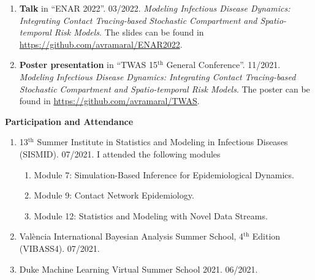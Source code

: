 \documentclass[11pt, ]{article}
\begin{document}
	\begin{enumerate}
		
		
		
		\item \textbf{Talk} in ``ENAR 2022''. 03/2022. \textit{Modeling Infectious Disease Dynamics: Integrating Contact Tracing-based	Stochastic Compartment and Spatio-temporal Risk Models}. The slides can be found in \href{https://github.com/avramaral/ENAR2022}{https://github.com/avramaral/ENAR2022}.
		
		\item \textbf{Poster presentation} in ``TWAS 15${}^{\text{th}}$ General Conference''. 11/2021. \textit{Modeling Infectious Disease Dynamics: Integrating Contact Tracing-based	Stochastic Compartment and Spatio-temporal Risk Models}. The poster can be found in \href{https://github.com/avramaral/TWAS}{https://github.com/avramaral/TWAS}.
	\end{enumerate}

{\Large \textbf{Participation and Attendance}}

\begin{enumerate}
	\item 13${}^{\text{th}}$ Summer Institute in Statistics and Modeling in Infectious Diseases (SISMID). 07/2021. I attended the following modules \vspace{-6pt}
	\begin{enumerate}[label*=\arabic*., noitemsep]
		\item Module 7: Simulation-Based Inference for Epidemiological Dynamics.
		\item Module 9: Contact Network Epidemiology.
		\item Module 12: Statistics and Modeling with Novel Data Streams.
	\end{enumerate}
	
	\item València International Bayesian Analysis Summer School, 4${}^{\text{th}}$ Edition (VIBASS4). 07/2021.
	
	\item Duke Machine Learning Virtual Summer School 2021. 06/2021.
\end{enumerate}

\vspace{6pt}
\end{document}
